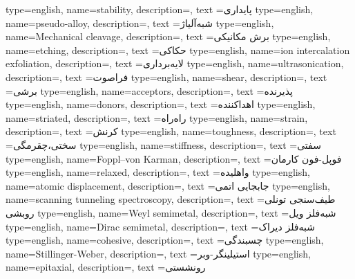 {
    type=english,
    name={stability},
    description={},
    text ={پایداری}
}
{
    type=english,
    name={pseudo-alloy},
    description={},
    text ={شبه‌آلیاژ}
}
{
    type=english,
    name={Mechanical cleavage},
    description={},
    text ={برش مکانیکی}
}
{
    type=english,
    name={etching},
    description={},
    text ={حکاکی}
}
{
    type=english,
    name={ion intercalation exfoliation},
    description={},
    text ={لایه‌برداری}
}
{
    type=english,
    name={ultrasonication},
    description={},
    text ={فراصوت}
}
{
    type=english,
    name={shear},
    description={},
    text ={برشی}
}
{
    type=english,
    name={acceptors},
    description={},
    text ={پذیرنده}
}
{
    type=english,
    name={donors},
    description={},
    text ={اهداکننده}
}
{
    type=english,
    name={striated},
    description={},
    text ={راه‌راه}
}
{
    type=english,
    name={strain},
    description={},
    text ={کرنش}
}
{
    type=english,
    name={toughness},
    description={},
    text ={سختی،چقرمگی}
}
{
    type=english,
    name={stiffness},
    description={},
    text ={سفتی}
}
{
    type=english,
    name={Foppl–von Karman},
    description={},
    text ={فوپل-فون کارمان}
}
{
    type=english,
    name={relaxed},
    description={},
    text ={واهلیده}
}
{
    type=english,
    name={atomic displacement},
    description={},
    text ={جابجایی اتمی}
}
{
    type=english,
    name={scanning tunneling spectroscopy},
    description={},
    text ={طیف‌سنجی تونلی روبشی}
}
{
    type=english,
    name={Weyl semimetal},
    description={},
    text ={شبه‌فلز ویل}
}
{
    type=english,
    name={Dirac semimetal},
    description={},
    text ={شبه‌فلز دیراک}
}
{
    type=english,
    name={cohesive},
    description={},
    text ={چسبندگی}
}
{
    type=english,
    name={Stillinger-Weber},
    description={},
    text ={استیلینگر-وبر}
}
{
    type=english,
    name={epitaxial},
    description={},
    text ={رونشستی}
}
